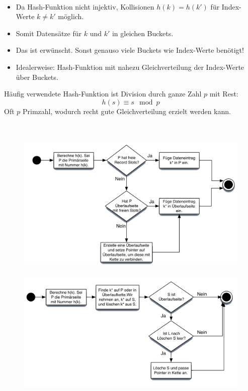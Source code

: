 \begin{frame}{\insertsection}
\framesubtitle{\insertsubsection}	
\begin{itemize}
\item Da Hash-Funktion nicht injektiv, Kollisionen $h(k) = h(k')$ f\"ur Index-Werte $k\ne k'$ m\"oglich.
\item Somit Datens\"atze f\"ur $k$ und $k'$ in gleichen Buckets.  
\item Das ist erw\"unscht. Sonst genauso viele Buckets wie Index-Werte ben\"otigt!
\item Idealerweise: Hash-Funktion mit nahezu Gleichverteilung der Index-Werte \"uber Buckets. 
\end{itemize}
\abs
\pause
H\"aufig verwendete Hash-Funktion ist Division durch ganze Zahl $p$ mit Rest:
\begin{equation*}
h(s) \equiv s\mod p
\end{equation*}
Oft $p$ Primzahl, wodurch recht gute Gleichverteilung erzielt werden kann. 
\end{frame}

\begin{frame}{\insertsection}
\framesubtitle{\insertsubsection}	
\\[-8pt]
\begin{figure}
\includegraphics[scale=0.3]{img/Hash-stat-01.png}
\end{figure}
\end{frame}

\begin{frame}{\insertsection}
\framesubtitle{\insertsubsection}	
\begin{figure}
\includegraphics[scale=0.3]{img/Hash-stat-02.png}
\end{figure}
\end{frame}

